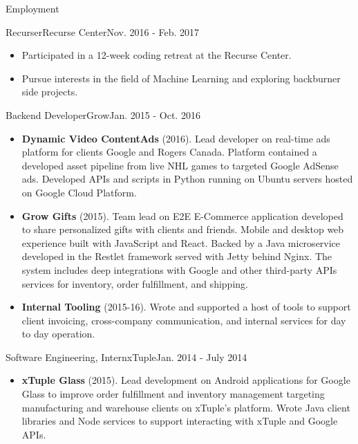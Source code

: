 \documentclass[]{mcdowellcv}
\begin{document}
    \makeheader

    \begin{cvsection}{Employment}

        \begin{cvsubsection}{Recurser}{Recurse Center}{Nov. 2016 - Feb. 2017}
            \begin{itemize}
                \item Participated in a 12-week coding retreat at the Recurse Center.
                \item Pursue interests in the field of Machine Learning and exploring backburner side projects.
            \end{itemize}
        \end{cvsubsection}

        \begin{cvsubsection}{Backend Developer}{Grow}{Jan. 2015 - Oct. 2016}
            \begin{itemize}
                \item \textbf{Dynamic Video ContentAds} (2016). Lead developer on real-time ads platform for clients Google and Rogers Canada. Platform contained a developed asset pipeline from live NHL games to targeted Google AdSense ads. Developed APIs and scripts in Python running on Ubuntu servers hosted on Google Cloud Platform.
            \end{itemize}
            \begin{itemize}
                \item \textbf{Grow Gifts} (2015). Team lead on E2E E-Commerce application developed to share personalized gifts with clients and friends. Mobile and desktop web experience built with JavaScript and React. Backed by a Java microservice developed in the Restlet framework served with Jetty behind Nginx. The system includes deep integrations with Google and other third-party APIs services for inventory, order fulfillment, and shipping.
            \end{itemize}
            \begin{itemize}
                \item \textbf{Internal Tooling} (2015-16). Wrote and supported a host of tools to support client invoicing, cross-company communication, and internal services for day to day operation.
            \end{itemize}
        \end{cvsubsection}

        \begin{cvsubsection}{Software Engineering, Intern}{xTuple}{Jan. 2014 - July 2014}
            \begin{itemize}
                \item \textbf{xTuple Glass} (2015). Lead development on Android applications for Google Glass to improve order fulfillment and inventory management targeting manufacturing and warehouse clients on xTuple’s platform. Wrote Java client libraries and Node services to support interacting with xTuple and Google APIs.
            \end{itemize}
        \end{cvsubsection}


\end{cvsection}
\end{document}
